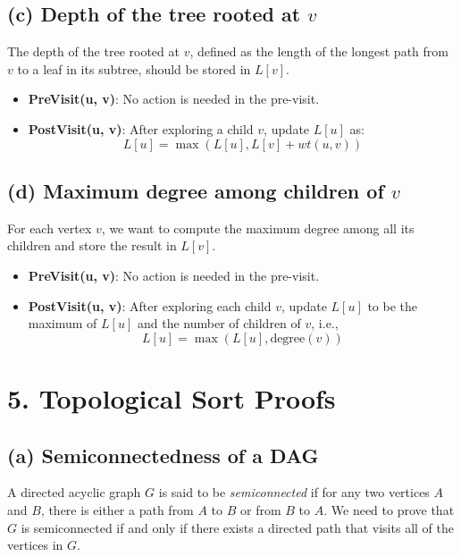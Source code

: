 \documentclass[11pt]{article}
\begin{document}
\subsection*{(c) Depth of the tree rooted at \( v \)}

The depth of the tree rooted at \( v \), defined as the length of the longest path from \( v \) to a leaf in its subtree, should be stored in \( L[v] \).

\begin{itemize}
    \item \textbf{PreVisit(u, v)}: No action is needed in the pre-visit.
    \item \textbf{PostVisit(u, v)}: After exploring a child \( v \), update \( L[u] \) as:
    \[
    L[u] = \max(L[u], L[v] + wt(u, v))
    \]
\end{itemize}

\subsection*{(d) Maximum degree among children of \( v \)}

For each vertex \( v \), we want to compute the maximum degree among all its children and store the result in \( L[v] \).

\begin{itemize}
    \item \textbf{PreVisit(u, v)}: No action is needed in the pre-visit.
    \item \textbf{PostVisit(u, v)}: After exploring each child \( v \), update \( L[u] \) to be the maximum of \( L[u] \) and the number of children of \( v \), i.e.,
    \[
    L[u] = \max(L[u], \text{degree}(v))
    \]
\end{itemize}

\newpage
\section*{5. Topological Sort Proofs}
\subsection*{(a) Semiconnectedness of a DAG}

A directed acyclic graph \( G \) is said to be \emph{semiconnected} if for any two vertices \( A \) and \( B \), there is either a path from \( A \) to \( B \) or from \( B \) to \( A \). We need to prove that \( G \) is semiconnected if and only if there exists a directed path that visits all of the vertices in \( G \).
\end{document}
